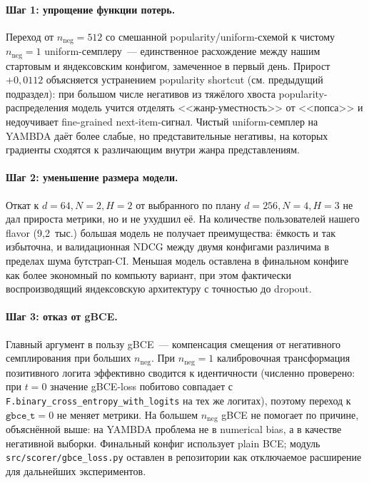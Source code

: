 \paragraph{Шаг 1: упрощение функции потерь.} Переход от $n_{\mathrm{neg}} = 512$ со смешанной popularity/uniform-схемой к чистому $n_{\mathrm{neg}} = 1$ uniform-семплеру~--- единственное расхождение между нашим стартовым и яндексовским конфигом, замеченное в первый день. Прирост $+0{,}0112$ объясняется устранением popularity shortcut (см. предыдущий подраздел): при большом числе негативов из тяжёлого хвоста popularity-распределения модель учится отделять <<жанр-уместность>> от <<попса>> и недоучивает fine-grained next-item-сигнал. Чистый uniform-семплер на YAMBDA даёт более слабые, но представительные негативы, на которых градиенты сходятся к различающим внутри жанра представлениям.

\paragraph{Шаг 2: уменьшение размера модели.} Откат к $d = 64, N = 2, H = 2$ от выбранного по плану $d = 256, N = 4, H = 3$ не дал прироста метрики, но и не ухудшил её. На количестве пользователей нашего flavor (9{,}2~тыс.) большая модель не получает преимущества: ёмкость и так избыточна, и валидационная NDCG между двумя конфигами различима в пределах шума бутстрап-CI. Меньшая модель оставлена в финальном конфиге как более экономный по компьюту вариант, при этом фактически воспроизводящий яндексовскую архитектуру с точностью до dropout.

\paragraph{Шаг 3: отказ от gBCE.} Главный аргумент в пользу gBCE~--- компенсация смещения от негативного семплирования при больших $n_{\mathrm{neg}}$. При $n_{\mathrm{neg}} = 1$ калибровочная трансформация позитивного логита эффективно сводится к идентичности (численно проверено: при $t = 0$ значение gBCE-loss побитово совпадает с \texttt{F.binary\_cross\_entropy\_with\_logits} на тех же логитах), поэтому переход к $\mathtt{gbce\_t} = 0$ не меняет метрики. На большем $n_{\mathrm{neg}}$ gBCE не помогает по причине, объяснённой выше: на YAMBDA проблема не в numerical bias, а в качестве негативной выборки. Финальный конфиг использует plain BCE; модуль \texttt{src/scorer/gbce\_loss.py} оставлен в репозитории как отключаемое расширение для дальнейших экспериментов.

